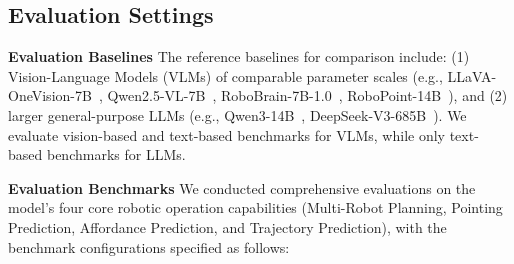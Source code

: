 \subsection{Evaluation Settings}
\textbf{Evaluation Baselines}
The reference baselines for comparison include: (1) Vision-Language Models (VLMs) of comparable parameter scales (e.g., LLaVA-OneVision-7B~\cite{li2024llavaov}, Qwen2.5-VL-7B~\cite{Qwen2.5-VL}, RoboBrain-7B-1.0~\cite{ji2025robobrain}, RoboPoint-14B~\cite{yuan2024robopoint}), and (2) larger general-purpose LLMs (e.g., Qwen3-14B~\cite{qwen3_2025}, DeepSeek-V3-685B~\cite{liu2024deepseek}). We evaluate vision-based and text-based benchmarks for VLMs, while only text-based benchmarks for LLMs. 

\textbf{Evaluation Benchmarks}
We conducted comprehensive evaluations on the model's four core robotic operation capabilities (Multi-Robot Planning, Pointing Prediction, Affordance Prediction, and Trajectory Prediction), with the benchmark configurations specified as follows:

